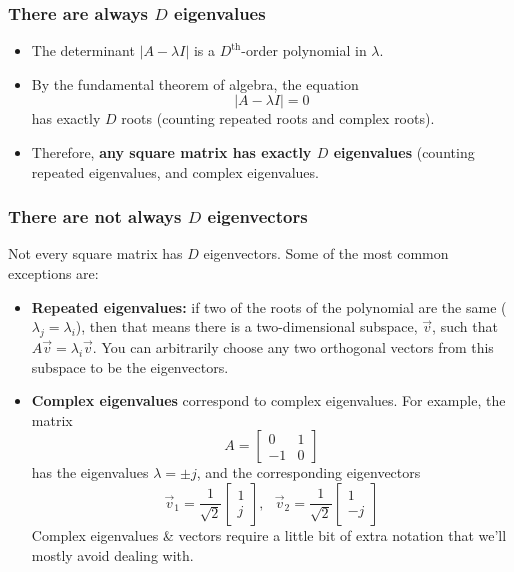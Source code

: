 \documentclass{beamer}
\begin{document}
\begin{frame}
  \frametitle{There are always $D$ eigenvalues}
  \begin{itemize}
  \item The determinant $|A-\lambda I|$ is a $D^{\textrm{th}}$-order polynomial in $\lambda$.
  \item By the fundamental theorem of algebra, the equation
    \[
    |A-\lambda I|=0
    \]
    has exactly $D$ roots (counting repeated roots and complex roots).
  \item Therefore, {\bf any square matrix has exactly $D$ eigenvalues}
    (counting repeated eigenvalues, and complex eigenvalues.
  \end{itemize}
\end{frame}

\begin{frame}
  \frametitle{There are not always $D$ eigenvectors}

  Not every square matrix has $D$ eigenvectors.  Some of the most
  common exceptions are:
  \begin{itemize}
  \item {\bf Repeated eigenvalues:} if two of the roots of the
    polynomial are the same ($\lambda_j=\lambda_i$), then that means
    there is a two-dimensional subspace, $\vec{v}$, such that
    $A\vec{v}=\lambda_i\vec{v}$.  You can arbitrarily choose any two
    orthogonal vectors from this subspace to be the eigenvectors.
  \item {\bf Complex eigenvalues} correspond to complex eigenvalues.
    For example, the matrix
    \[
    A=\left[\begin{array}{cc}0&1\\-1&0\end{array}\right]
    \]
    has the eigenvalues $\lambda=\pm j$, and the corresponding eigenvectors
    \[
    \vec{v}_1=\frac{1}{\sqrt{2}}\left[\begin{array}{c}1\\j\end{array}\right],~~~
    \vec{v}_2=\frac{1}{\sqrt{2}}\left[\begin{array}{c}1\\-j\end{array}\right]
    \]
    Complex eigenvalues \& vectors require a little bit of extra notation that
    we'll mostly avoid dealing with.
  \end{itemize}
\end{frame}


\end{document}
